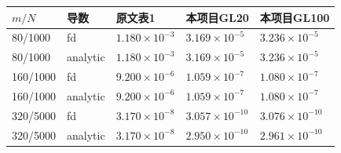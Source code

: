 \begin{tabular}{lllll}\toprule
$m/N$ & 导数 & 原文表1 & 本项目GL20 & 本项目GL100 \\ \midrule
80/1000 & fd & $1.180\times10^{-3}$ & $3.169\times10^{-5}$ & $3.236\times10^{-5}$ \\
80/1000 & analytic & $1.180\times10^{-3}$ & $3.169\times10^{-5}$ & $3.236\times10^{-5}$ \\
160/1000 & fd & $9.200\times10^{-6}$ & $1.059\times10^{-7}$ & $1.080\times10^{-7}$ \\
160/1000 & analytic & $9.200\times10^{-6}$ & $1.059\times10^{-7}$ & $1.080\times10^{-7}$ \\
320/5000 & fd & $3.170\times10^{-8}$ & $3.057\times10^{-10}$ & $3.076\times10^{-10}$ \\
320/5000 & analytic & $3.170\times10^{-8}$ & $2.950\times10^{-10}$ & $2.961\times10^{-10}$ \\
\bottomrule\end{tabular}

